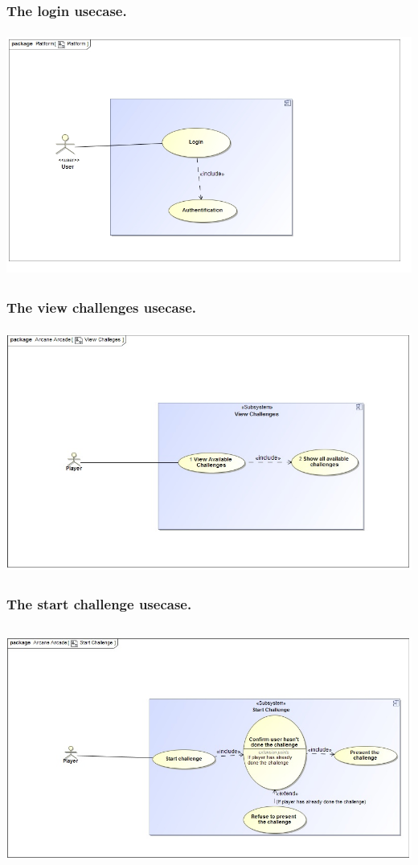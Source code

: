 \documentclass[english]{article}
\begin{document}
		\subsubsection* {The login usecase.}
		\includegraphics[width=14cm,height=8cm,keepaspectratio]{login.jpg}\\
		
		\subsubsection* {The view challenges usecase.}
		\includegraphics[width=14cm,height=8cm,keepaspectratio]{viewChallenges.jpg}
		
		\subsubsection* {The start challenge usecase.}
		\includegraphics[width=14cm,height=8cm,keepaspectratio]{startChallenge.jpg}
		
\end{document}

